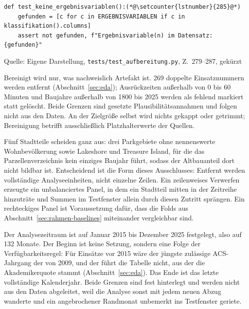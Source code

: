 \documentclass[12pt,a4paper]{article}
\newcommand{\tabquelle}[1][Eigene Darstellung]{%
  \par\setlength{\parskip}{0pt}\vspace{3pt}%
  {\setstretch{1}\fontsize{9pt}{11pt}\selectfont\raggedright Quelle: #1\par}%
}
\begin{document}
\begin{quellcode}[htbp]
\caption{Prüfung auf Ergebnisvariablen in der erzeugten Datei}
\label{lst:test-leakage}\vspace{-3.5pt}
\begin{lstlisting}[style=pythonstil,firstnumber=279]
def test_keine_ergebnisvariablen():(*@\setcounter{lstnumber}{285}@*)
    gefunden = [c for c in ERGEBNISVARIABLEN if c in klassifikation().columns]
    assert not gefunden, f"Ergebnisvariable(n) im Datensatz: {gefunden}"
\end{lstlisting}
\tabquelle[Eigene Darstellung, \texttt{tests/test\_aufbereitung.py}, Z.~279--287, gekürzt]
\end{quellcode}
 
Bereinigt wird nur, was nachweislich Artefakt ist. 269 doppelte Einsatznummern
werden entfernt (Abschnitt~\ref{sec:eda}); Ausrückzeiten außerhalb von 0 bis 60
Minuten und Baujahre außerhalb von 1800 bis 2025 werden als fehlend markiert
statt gelöscht. Beide Grenzen sind gesetzte Plausibilitätsannahmen und folgen
nicht aus den Daten. An der Zielgröße selbst wird nichts gekappt oder getrimmt;
Bereinigung betrifft ausschließlich Platzhalterwerte der Quellen.
 
Fünf Stadtteile scheiden ganz aus: drei Parkgebiete ohne nennenswerte
Wohnbevölkerung sowie Lakeshore und Treasure Island, für die das
Parzellenverzeichnis kein einziges Baujahr führt, sodass der Altbauanteil dort
nicht bildbar ist. Entscheidend ist die Form
dieses Ausschlusses: Entfernt werden vollständige Analyseeinheiten, nicht
einzelne Zeilen. Ein zeilenweises Verwerfen erzeugte ein unbalanciertes Panel,
in dem ein Stadtteil mitten in der Zeitreihe hinzuträte und Summen im
Testfenster allein durch diesen Zutritt sprängen. Ein rechteckiges Panel ist
Voraussetzung dafür, dass die Folds aus Abschnitt~\ref{sec:rahmen-baselines}
miteinander vergleichbar sind.
 
Der Analysezeitraum ist auf Januar 2015 bis Dezember 2025 festgelegt, also auf
132 Monate. Der Beginn ist keine Setzung, sondern eine Folge der
Verfügbarkeitsregel: Für Einsätze vor 2015 wäre der jüngste zulässige
ACS-Jahrgang der von 2009, und der führt die Tabelle nicht, aus der die
Akademikerquote stammt (Abschnitt~\ref{sec:eda}). Das Ende ist das letzte
vollständige Kalenderjahr. Beide Grenzen sind fest hinterlegt und werden nicht
aus den Daten abgeleitet, weil die Analyse sonst mit jedem neuen Abzug wanderte
und ein angebrochener Randmonat unbemerkt ins Testfenster geriete.
 
\end{document}
